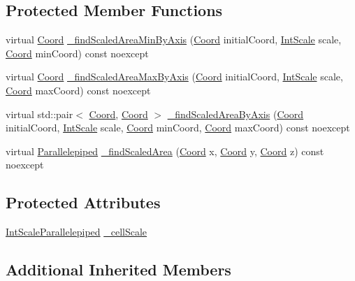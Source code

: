 \subsection*{Protected Member Functions}
\begin{DoxyCompactItemize}
\item 
virtual \hyperlink{struct_coord}{Coord} \hyperlink{class_scalable_bound_temperature_world_ae8c72b04365794622707fa1a0101c73a}{\-\_\-find\-Scaled\-Area\-Min\-By\-Axis} (\hyperlink{struct_coord}{Coord} initial\-Coord, \hyperlink{struct_int_scale}{Int\-Scale} scale, \hyperlink{struct_coord}{Coord} min\-Coord) const noexcept
\item 
virtual \hyperlink{struct_coord}{Coord} \hyperlink{class_scalable_bound_temperature_world_ac77d4cc1f6df5ec994311915a5e92095}{\-\_\-find\-Scaled\-Area\-Max\-By\-Axis} (\hyperlink{struct_coord}{Coord} initial\-Coord, \hyperlink{struct_int_scale}{Int\-Scale} scale, \hyperlink{struct_coord}{Coord} max\-Coord) const noexcept
\item 
virtual std\-::pair$<$ \hyperlink{struct_coord}{Coord}, \hyperlink{struct_coord}{Coord} $>$ \hyperlink{class_scalable_bound_temperature_world_af4905396b44aec6b7d4efa46afda6919}{\-\_\-find\-Scaled\-Area\-By\-Axis} (\hyperlink{struct_coord}{Coord} initial\-Coord, \hyperlink{struct_int_scale}{Int\-Scale} scale, \hyperlink{struct_coord}{Coord} min\-Coord, \hyperlink{struct_coord}{Coord} max\-Coord) const noexcept
\item 
virtual \hyperlink{struct_parallelepiped}{Parallelepiped} \hyperlink{class_scalable_bound_temperature_world_a418f5c5ca361cea3cfc189ae22b35130}{\-\_\-find\-Scaled\-Area} (\hyperlink{struct_coord}{Coord} x, \hyperlink{struct_coord}{Coord} y, \hyperlink{struct_coord}{Coord} z) const noexcept
\end{DoxyCompactItemize}
\subsection*{Protected Attributes}
\begin{DoxyCompactItemize}
\item 
\hyperlink{struct_int_scale_parallelepiped}{Int\-Scale\-Parallelepiped} \hyperlink{class_scalable_bound_temperature_world_a3ad7a326006a4abbb1c7b64b4bf4d791}{\-\_\-cell\-Scale}
\end{DoxyCompactItemize}
\subsection*{Additional Inherited Members}


